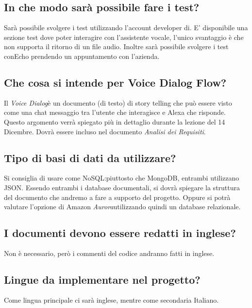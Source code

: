 \documentclass[a4paper,12pt]{article}
\begin{document}
	\subsection{In che modo sarà possibile fare i test?}
	Sarà possibile svolgere i test utilizzando l'account developer di. E' disponibile una sezione test dove poter interagire con l'assistente vocale, l'unico svantaggio è che non supporta il ritorno di un file audio. Inoltre sarà possibile svolgere i test conEcho prendendo un appuntamento con l'azienda.

	\subsection{Che cosa si intende per Voice Dialog Flow?}
	Il \textit{Voice Dialog}è un documento (di testo) di story telling che può essere visto come una chat messaggio tra l'utente che interagisce e Alexa che risponde. \\
	Questo argomento verrà spiegato più in dettaglio durante la lezione del 14 Dicembre. Dovrà essere incluso nel documento \textit{Analisi dei Requisiti}.
	
	\subsection{Tipo di basi di dati da utilizzare?}
	Si consiglia di usare come NoSQL:piuttosto che MongoDB, entrambi utilizzano JSON. Essendo entrambi i database documentali, si dovrà spiegare la struttura del documento che andremo a fare a supporto del progetto. Oppure si potrà valutare l'opzione di Amazon \textit{Aurora}utilizzando quindi un database relazionale.
	
	\subsection{I documenti devono essere redatti in inglese?}
	Non è necessario, però i commenti del codice andranno fatti in inglese.
	
	\subsection{Lingue da implementare nel progetto?}
	Come lingua principale ci sarà inglese, mentre come secondaria Italiano.
	
\end{document}
